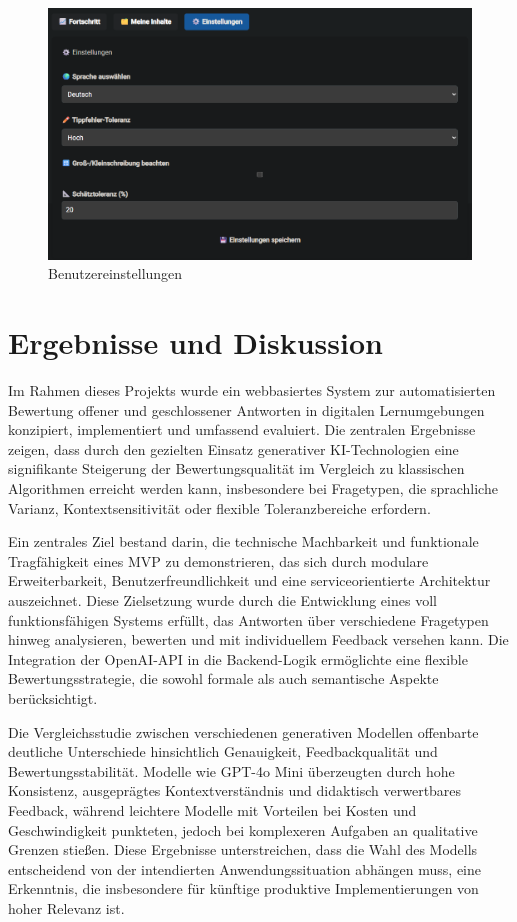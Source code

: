 \documentclass[a4paper,12pt]{article}
\begin{document}
\begin{figure}[H]
    \centering
    \includegraphics[width=1\textwidth]{Bilder/settings.png}
    \caption{Benutzereinstellungen}
    \label{fig:settings}
\end{figure}
\newpage

\section{Ergebnisse und Diskussion}

Im Rahmen dieses Projekts wurde ein webbasiertes System zur automatisierten Bewertung offener und geschlossener Antworten in digitalen Lernumgebungen konzipiert, implementiert und umfassend evaluiert. Die zentralen Ergebnisse zeigen, dass durch den gezielten Einsatz generativer KI-Technologien eine signifikante Steigerung der Bewertungsqualität im Vergleich zu klassischen Algorithmen erreicht werden kann, insbesondere bei Fragetypen, die sprachliche Varianz, Kontextsensitivität oder flexible Toleranzbereiche erfordern.

Ein zentrales Ziel bestand darin, die technische Machbarkeit und funktionale Tragfähigkeit eines MVP zu demonstrieren, das sich durch modulare Erweiterbarkeit, Benutzerfreundlichkeit und eine serviceorientierte Architektur auszeichnet. Diese Zielsetzung wurde durch die Entwicklung eines voll funktionsfähigen Systems erfüllt, das Antworten über verschiedene Fragetypen hinweg analysieren, bewerten und mit individuellem Feedback versehen kann. Die Integration der OpenAI-API in die Backend-Logik ermöglichte eine flexible Bewertungsstrategie, die sowohl formale als auch semantische Aspekte berücksichtigt.

Die Vergleichsstudie zwischen verschiedenen generativen Modellen offenbarte deutliche Unterschiede hinsichtlich Genauigkeit, Feedbackqualität und Bewertungsstabilität. Modelle wie GPT-4o Mini überzeugten durch hohe Konsistenz, ausgeprägtes Kontextverständnis und didaktisch verwertbares Feedback, während leichtere Modelle mit Vorteilen bei Kosten und Geschwindigkeit punkteten, jedoch bei komplexeren Aufgaben an qualitative Grenzen stießen. Diese Ergebnisse unterstreichen, dass die Wahl des Modells entscheidend von der intendierten Anwendungssituation abhängen muss, eine Erkenntnis, die insbesondere für künftige produktive Implementierungen von hoher Relevanz ist.
\end{document}
